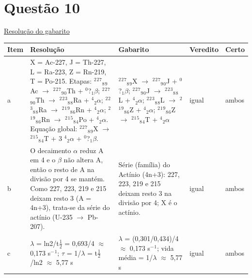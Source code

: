 \documentclass{article}%
\begin{document}
\section*{Questão 10}%
\href{https://poliedroresolve.sistemapoliedro.com.br/vestibulares/ime/2026/ime-2-fase-dia-3-25-10-2025-2-fase-dia-3/dissertativa-10-quimica-2-fase-dia-3-ime-2026}{Resolução do gabarito}\par\smallskip%
\begin{longtable}{@{}p{} p{} p{} p{} p{}@{}}\toprule Item & Resolução & Gabarito & Veredito & Certo \\ \midrule
a & X = Ac{-}227, J = Th{-}227, L = Ra{-}223, Z = Rn{-}219, T = Po{-}215. Etapas: $^2$$^2$$^{7}$$_{8}$$_{9}$Ac $\to$ $^2$$^2$$^{7}$$_{9}$$_{0}$Th + $^{0}$?$_{1}$$\beta$; $^2$$^2$$^{7}$$_{9}$$_{0}$Th $\to$ $^2$$^2$$^3$$_{8}$$_{8}$Ra + $^{4}$$_{2}$$\alpha$; $^2$$^2$$^3$$_{8}$$_{8}$Ra $\to$ $^2$$^{1}$$^{9}$$_{8}$$_{6}$Rn + $^{4}$$_{2}$$\alpha$; $^2$$^{1}$$^{9}$$_{8}$$_{6}$Rn $\to$ $^2$$^{1}$$^{5}$$_{8}$$_{4}$Po + $^{4}$$_{2}$$\alpha$. Equação global: $^2$$^2$$^{7}$$_{8}$$_{9}$X $\to$ $^2$$^{1}$$^{5}$$_{8}$$_{4}$T + 3 $^{4}$$_{2}$$\alpha$ + $^{0}$?$_{1}$$\beta$. & $^2$$^2$$^{7}$$_{8}$$_{9}$X $\to$ $^2$$^2$$^{7}$$_{9}$$_{0}$J + $^{0}$?$_{1}$$\beta$; $^2$$^2$$^{7}$$_{9}$$_{0}$J $\to$ $^2$$^2$$^3$$_{8}$$_{8}$L + $^{4}$$_{2}$$\alpha$; $^2$$^2$$^3$$_{8}$$_{8}$L $\to$ $^2$$^{1}$$^{9}$$_{8}$$_{6}$Z + $^{4}$$_{2}$$\alpha$; $^2$$^{1}$$^{9}$$_{8}$$_{6}$Z $\to$ $^2$$^{1}$$^{5}$$_{8}$$_{4}$T + $^{4}$$_{2}$$\alpha$ & igual & ambos \\
b & O decaimento $\alpha$ reduz A em 4 e o $\beta$ não altera A, então o resto de A na divisão por 4 se mantém. Como 227, 223, 219 e 215 deixam resto 3 (A = 4n+3), trata{-}se da série do actínio (U{-}235 $\to$ Pb{-}207). & Série (família) do Actínio (4n+3): 227, 223, 219 e 215 deixam resto 3 na divisão por 4; X é o actínio. & igual & ambos \\
c & $\lambda$ = ln2/t$\frac12$ = 0,693/4 $\approx$ 0,173 s$^{-}$$^{1}$; $\tau$ = 1/$\lambda$ = t$\frac12$/ln2 $\approx$ 5,77 s & $\lambda$ = (0,301/0,434)/4 $\approx$ 0,173 s$^{-}$$^{1}$; vida média = 1/$\lambda$ $\approx$ 5,77 s & igual & ambos \\
\bottomrule\end{longtable}%
\end{document}
